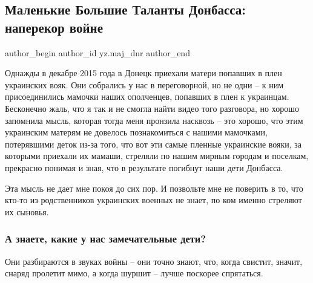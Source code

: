  
 
 
 
 
\subsection{Маленькие Большие Таланты Донбасса: наперекор войне}
\label{sec:05_12_2021.yz.maj_dnr.1.deti_talanty_donbassa}


\ifcmt
 author_begin
   author_id yz.maj_dnr
 author_end
\fi


Однажды в декабре 2015 года в Донецк приехали матери попавших в плен украинских
вояк. Они собрались у нас в переговорной, но не одни – к ним присоединились
мамочки наших ополченцев, попавших в плен к украинцам. Бесконечно жаль, что я
так и не смогла найти видео того разговора, но хорошо запомнила мысль, которая
тогда меня пронзила насквозь – это хорошо, что этим украинским матерям не
довелось познакомиться с нашими мамочками, потерявшими деток из-за того, что
вот эти самые пленные украинские вояки, за которыми приехали их мамаши,
стреляли по нашим мирным городам и поселкам, прекрасно понимая и зная, что в
результате погибнут наши дети Донбасса.

Эта мысль не дает мне покоя до сих пор. И позвольте мне не поверить в то, что
кто-то из родственников украинских военных не знает, по ком именно стреляют их
сыновья. 

\subsubsection{А знаете, какие у нас замечательные дети?}

Они разбираются в звуках войны – они точно знают, что, когда свистит, значит,
снаряд пролетит мимо, а когда шуршит – лучше поскорее спрятаться.

